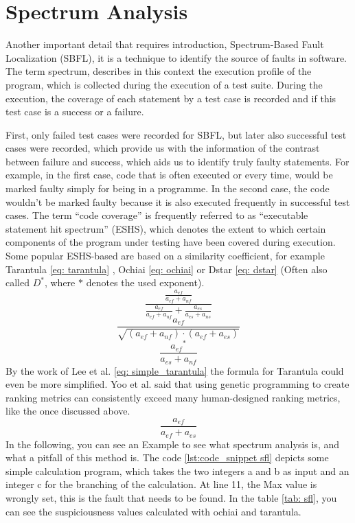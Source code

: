 \section{Spectrum Analysis}\label{sec:spectrum-analysis}
Another important detail that requires introduction, Spectrum-Based Fault Localization (SBFL)\cite{wong_handbook_2023}, it is a technique to identify the source of faults in software.
The term spectrum, describes in this context the execution profile of the program, which is collected during the execution of a test suite.
During the execution, the coverage of each statement by a test case is recorded and if this test case is a success or a failure.

First, only failed test cases were recorded for SBFL, but later also successful test cases were recorded, which provide us with the information of the contrast between failure and success, which aids us to identify truly faulty statements.
For example, in the first case, code that is often executed or every time, would be marked faulty simply for being in a programme.
In the second case, the code wouldn't be marked faulty because it is also executed frequently in successful test cases.
The term “code coverage” is frequently referred to as “executable statement hit spectrum” (ESHS), which denotes the extent to which certain components of the program under testing have been covered during execution.
Some popular ESHS-based are based on a similarity coefficient, for example Tarantula\cite{jones_empirical_2005} \ref{eq: tarantula} , Ochiai\cite{ochiai_zoogeographical_1957} \ref{eq: ochiai} or Dstar\cite{wong_dstar_2014} \ref{eq: dstar} (Often also called $D^*$, where $*$ denotes the used exponent).
\begin{equation}
    \frac{\frac{a_{ef}}{a_{ef} + a_{nf}}}{\frac{a_{ef}}{a_{ef} + a_{nf}}+\frac{a_{es}}{a_{es} + a_{ns}}}
    \label{eq: tarantula}
\end{equation}
\begin{equation}
    \frac{a_{ef}}{\sqrt{(a_{ef}+a_{nf})\cdot(a_{ef}+a_{es})}}
    \label{eq: ochiai}
\end{equation}
\begin{equation}
    \frac{{a_{ef}}^*}{a_{es}+a_{nf}}
    \label{eq: dstar}
\end{equation}
By the work of Lee et al. \cite{hua_jie_lee_study_2009} \ref{eq: simple_tarantula} the formula for Tarantula could even be more simplified.
Yoo et al. \cite{yoo_human_2017}said that using genetic programming to create ranking metrics can consistently exceed many human-designed ranking metrics, like the once discussed above.
\begin{equation}
    \frac{a_{ef}}{a_{ef}+a_{es}}
    \label{eq: simple_tarantula}
\end{equation}
In the following, you can see an Example \cite{parsa_software_2023} to see what spectrum analysis is, and what a pitfall of this method is.
The code \ref{lst:code_snippet sfl} depicts some simple calculation program, which takes the two integers a and b as input and an integer c for the branching of the calculation.
At line 11, the Max value is wrongly set, this is the fault that needs to be found.
In the table \ref{tab: sfl}, you can see the suspiciousness values calculated with ochiai and tarantula.

